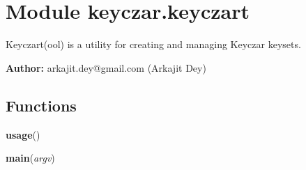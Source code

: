 %
%
%


\section{Module keyczar.keyczart}

    \label{keyczar:keyczart}
Keyczart(ool) is a utility for creating and managing Keyczar keysets.

\textbf{Author:} arkajit.dey@gmail.com (Arkajit Dey)





  \subsection{Functions}

    \label{keyczar:keyczart:usage}

    \vspace{0.5ex}

\hspace{.8\funcindent}\begin{boxedminipage}{\funcwidth}

    \raggedright \textbf{usage}()

\setlength{\parskip}{2ex}
\setlength{\parskip}{1ex}
    \end{boxedminipage}

    \label{keyczar:keyczart:main}

    \vspace{0.5ex}

\hspace{.8\funcindent}\begin{boxedminipage}{\funcwidth}

    \raggedright \textbf{main}(\textit{argv})

\setlength{\parskip}{2ex}
\setlength{\parskip}{1ex}
    \end{boxedminipage}


